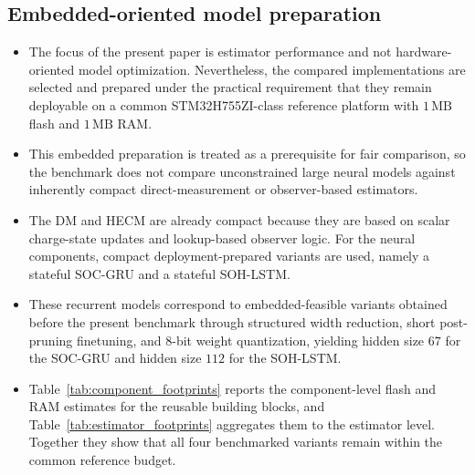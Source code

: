 \documentclass[review,nopreprintline]{elsarticle}
\begin{document}
\subsection{Embedded-oriented model preparation}
\begin{itemize}[leftmargin=*]
    \item The focus of the present paper is estimator performance and not hardware-oriented model optimization. Nevertheless, the compared implementations are selected and prepared under the practical requirement that they remain deployable on a common STM32H755ZI-class reference platform with $1\,\mathrm{MB}$ flash and $1\,\mathrm{MB}$ RAM.
    \item This embedded preparation is treated as a prerequisite for fair comparison, so the benchmark does not compare unconstrained large neural models against inherently compact direct-measurement or observer-based estimators.
    \item The DM and HECM are already compact because they are based on scalar charge-state updates and lookup-based observer logic. For the neural components, compact deployment-prepared variants are used, namely a stateful SOC-GRU and a stateful SOH-LSTM.
    \item These recurrent models correspond to embedded-feasible variants obtained before the present benchmark through structured width reduction, short post-pruning finetuning, and $8$-bit weight quantization, yielding hidden size $67$ for the SOC-GRU and hidden size $112$ for the SOH-LSTM.
    \item Table~\ref{tab:component_footprints} reports the component-level flash and RAM estimates for the reusable building blocks, and Table~\ref{tab:estimator_footprints} aggregates them to the estimator level. Together they show that all four benchmarked variants remain within the common reference budget.
\end{itemize}
\end{document}
